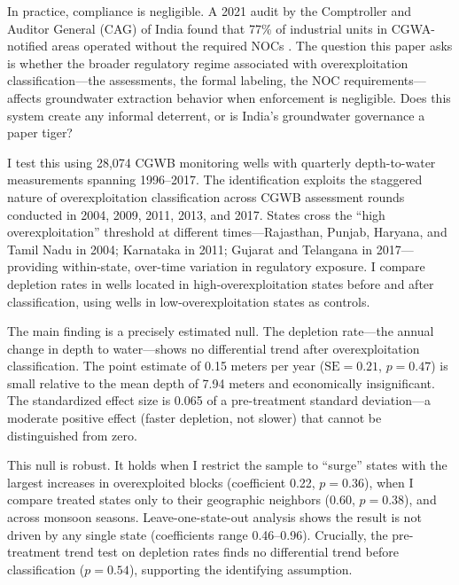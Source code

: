 \documentclass[12pt]{article}
\begin{document}
In practice, compliance is negligible. A 2021 audit by the Comptroller and Auditor General (CAG) of India found that 77\% of industrial units in CGWA-notified areas operated without the required NOCs \citep{cag2021groundwater}. The question this paper asks is whether the broader regulatory regime associated with overexploitation classification---the assessments, the formal labeling, the NOC requirements---affects groundwater extraction behavior when enforcement is negligible. Does this system create any informal deterrent, or is India's groundwater governance a paper tiger?

I test this using 28,074 CGWB monitoring wells with quarterly depth-to-water measurements spanning 1996--2017. The identification exploits the staggered nature of overexploitation classification across CGWB assessment rounds conducted in 2004, 2009, 2011, 2013, and 2017. States cross the ``high overexploitation'' threshold at different times---Rajasthan, Punjab, Haryana, and Tamil Nadu in 2004; Karnataka in 2011; Gujarat and Telangana in 2017---providing within-state, over-time variation in regulatory exposure. I compare depletion rates in wells located in high-overexploitation states before and after classification, using wells in low-overexploitation states as controls.

The main finding is a precisely estimated null. The depletion rate---the annual change in depth to water---shows no differential trend after overexploitation classification. The point estimate of 0.15 meters per year ($\text{SE} = 0.21$, $p = 0.47$) is small relative to the mean depth of 7.94 meters and economically insignificant. The standardized effect size is 0.065 of a pre-treatment standard deviation---a moderate positive effect (faster depletion, not slower) that cannot be distinguished from zero.

This null is robust. It holds when I restrict the sample to ``surge'' states with the largest increases in overexploited blocks (coefficient 0.22, $p = 0.36$), when I compare treated states only to their geographic neighbors (0.60, $p = 0.38$), and across monsoon seasons. Leave-one-state-out analysis shows the result is not driven by any single state (coefficients range 0.46--0.96). Crucially, the pre-treatment trend test on depletion rates finds no differential trend before classification ($p = 0.54$), supporting the identifying assumption.
\end{document}
